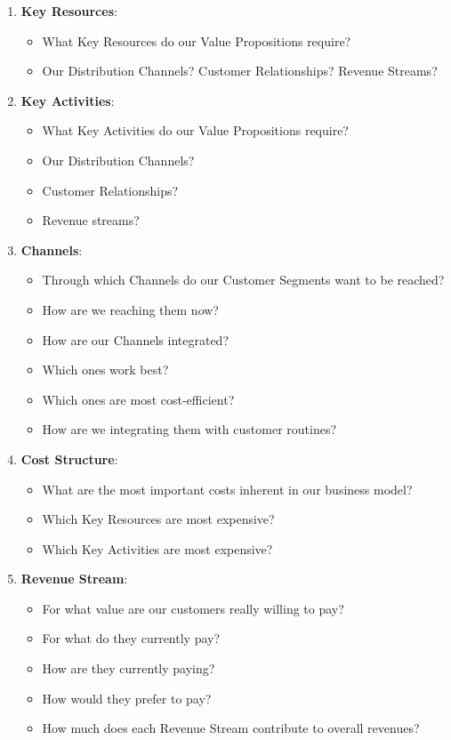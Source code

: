 \documentclass[final,a4paper]{report} %
\begin{document}
\begin{enumerate}
		\item \textbf{Key Resources}:
		\begin{itemize}
			\item What Key Resources do our Value Propositions require?
			\item Our Distribution Channels? Customer Relationships? Revenue Streams?
		\end{itemize}
		
		\item \textbf{Key Activities}:
		\begin{itemize}
			\item What Key Activities do our Value Propositions require?
			\item Our Distribution Channels?
			\item Customer Relationships?
			\item Revenue streams?
		\end{itemize}
		
		\item \textbf{Channels}:
		\begin{itemize}
			\item Through which Channels do our Customer Segments want to be reached?
			\item How are we reaching them now?
			\item How are our Channels integrated?
			\item Which ones work best?
			\item Which ones are most cost-efficient?
			\item How are we integrating them with customer routines?
		\end{itemize}
		
		\item \textbf{Cost Structure}:
		\begin{itemize}
			\item What are the most important costs inherent in our business model?
			\item Which Key Resources are most expensive?
			\item Which Key Activities are most expensive?
		\end{itemize}
		
		\item \textbf{Revenue Stream}:
		\begin{itemize}
			\item For what value are our customers really willing to pay?
			\item For what do they currently pay?
			\item How are they currently paying?
			\item How would they prefer to pay?
			\item How much does each Revenue Stream contribute to overall revenues?
		\end{itemize}
	\end{enumerate}
\end{document}
